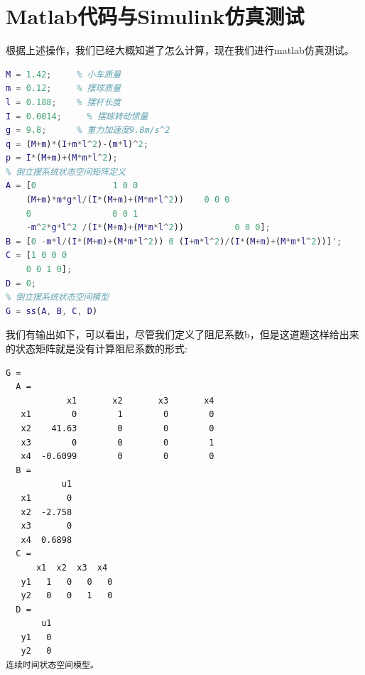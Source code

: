 \documentclass{article}
\begin{document}
\section*{Matlab代码与Simulink仿真测试}
根据上述操作，我们已经大概知道了怎么计算，现在我们进行matlab仿真测试。
\begin{lstlisting}[language=matlab,numbers=none]
% 倒立摆系统参数
M = 1.42;     % 小车质量
m = 0.12;     % 摆球质量
l = 0.188;    % 摆杆长度
I = 0.0014;     % 摆球转动惯量
g = 9.8;      % 重力加速度9.8m/s^2
q = (M+m)*(I+m*l^2)-(m*l)^2;
p = I*(M+m)+(M*m*l^2);
% 倒立摆系统状态空间矩阵定义
A = [0               1 0 0
    (M+m)*m*g*l/(I*(M+m)+(M*m*l^2))    0 0 0
    0                0 0 1
    -m^2*g*l^2 /(I*(M+m)+(M*m*l^2))          0 0 0];
B = [0 -m*l/(I*(M+m)+(M*m*l^2)) 0 (I+m*l^2)/(I*(M+m)+(M*m*l^2))]';
C = [1 0 0 0
    0 0 1 0];
D = 0;
% 倒立摆系统状态空间模型
G = ss(A, B, C, D)
\end{lstlisting}
我们有输出如下，可以看出，尽管我们定义了阻尼系数b，但是这道题这样给出来的状态矩阵就是没有计算阻尼系数的形式:
\begin{lstlisting}[numbers=none]
G =
  A = 
            x1       x2       x3       x4
   x1        0        1        0        0
   x2    41.63        0        0        0
   x3        0        0        0        1
   x4  -0.6099        0        0        0
  B = 
           u1
   x1       0
   x2  -2.758
   x3       0
   x4  0.6898
  C = 
      x1  x2  x3  x4
   y1   1   0   0   0
   y2   0   0   1   0
  D = 
       u1
   y1   0 
   y2   0
连续时间状态空间模型。
\end{lstlisting}
\end{document}
